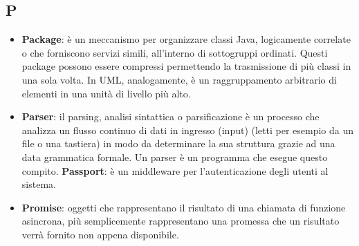 \subsection{P}
\begin{itemize} 
	\item
	\textbf{Package}: è un meccanismo per organizzare classi Java, logicamente correlate o che forniscono servizi simili, all’interno di sottogruppi ordinati. Questi package possono essere compressi permettendo la trasmissione di più classi in una sola volta. In UML, analogamente, è un raggruppamento arbitrario di elementi in una unità di livello più alto.
	\item
	\textbf{Parser}: il parsing, analisi sintattica o parsificazione è un processo che analizza un flusso continuo di dati in ingresso (input) (letti per esempio da un file o una tastiera) in modo da determinare la sua struttura grazie ad una data grammatica formale. Un parser è un programma che esegue questo compito.
	\textbf{Passport}: è un middleware per l'autenticazione degli utenti al sistema.
	\item
	\textbf{Promise}: oggetti che rappresentano il risultato di una chiamata di funzione asincrona, più semplicemente rappresentano una promessa che un risultato verrà fornito non appena disponibile.
\end{itemize}

